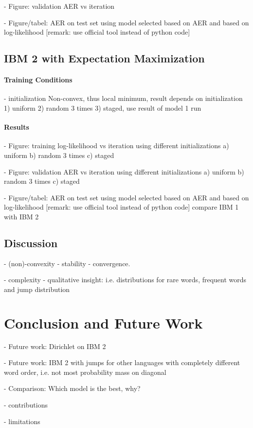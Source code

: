 \documentclass[11pt,a4paper]{article}
\begin{document}
- Figure: validation AER vs iteration

- Figure/tabel: AER on test set using model selected based on AER and based on log-likelihood [remark: use official tool instead of python code]  


\subsection{IBM 2 with Expectation Maximization}
\label{IBM2}

\paragraph{Training Conditions}

- initialization
Non-convex, thus local minimum, result depends on initialization
1) uniform 
2) random 3 times 
3) staged, use result of model 1 run


\paragraph{Results}

- Figure: training log-likelihood vs iteration
using different initializations
a) uniform 
b) random 3 times 
c) staged 

- Figure: validation AER vs iteration
using different initializations
a) uniform 
b) random 3 times 
c) staged 

- Figure/tabel: AER on test set using model selected based on AER and based on log-likelihood [remark: use official tool instead of python code]  
compare IBM 1 with IBM 2

\subsection{Discussion}

- (non)-convexity 
- stability 
- convergence.

- complexity
- qualitative insight: 
i.e. distributions for rare words, frequent words and jump distribution


\section{Conclusion and Future Work}

- Future work: Dirichlet on IBM 2

- Future work: IBM 2 with jumps for other languages with completely different word order,
i.e. not most probability mass on diagonal

- Comparison: Which model is the best, why?

- contributions 

- limitations
\end{document}
